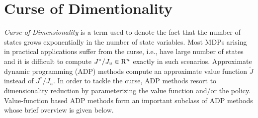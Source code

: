 \section{Curse of Dimentionality}
\emph{Curse-of-Dimensionality} is a term used to denote the fact that the number of states grows exponentially in the number of state variables. Most MDPs arising in practical applications suffer from the curse, i.e., have large number of states and it is difficult to compute $J^*/J_u\in \mathrm{R}^n$ exactly in such scenarios. Approximate dynamic programming (ADP) \cite{lspi,lspe,ALP,wang2014approximate} methods compute an approximate value function $\tilde{J}$ instead of $J^*/J_u$. In order to tackle the curse, ADP methods resort to dimensionality reduction by parameterizing the value function and/or the policy. Value-function based ADP methods form an important subclass of ADP methods whose brief overview is given below.
